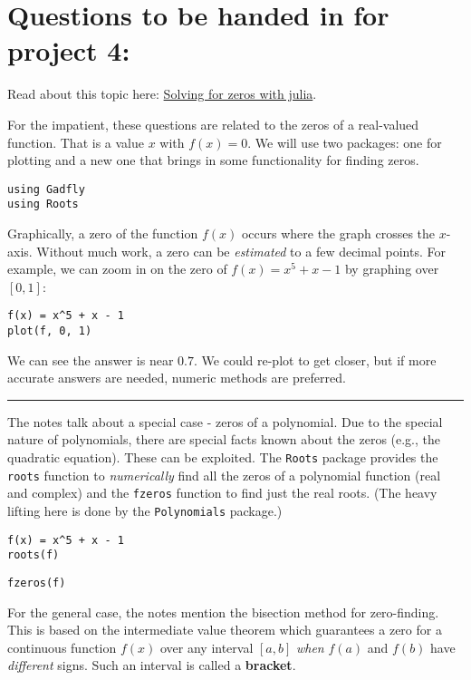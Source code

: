 \documentclass[12pt]{article}
\begin{document}
\section{Questions to be handed in for project 4:}

Read about this topic here:
\href{http://mth229.github.io/zeros.html}{Solving for zeros with julia}.

For the impatient, these questions are related to the zeros of a
real-valued function. That is a value $x$ with $f(x)=0$. We will use two
packages: one for plotting and a new one that brings in some
functionality for finding zeros.



\begin{verbatim}
using Gadfly        
using Roots
\end{verbatim}
Graphically, a zero of the function $f(x)$ occurs where the graph
crosses the $x$-axis. Without much work, a zero can be \emph{estimated}
to a few decimal points. For example, we can zoom in on the zero of
$f(x) = x^5 + x - 1$ by graphing over $[0,1]$:



\begin{verbatim}
f(x) = x^5 + x - 1
plot(f, 0, 1)
\end{verbatim}
We can see the answer is near $0.7$. We could re-plot to get closer, but
if more accurate answers are needed, numeric methods are preferred.

\begin{center}\rule{3in}{0.4pt}\end{center}

The notes talk about a special case - zeros of a polynomial. Due to the
special nature of polynomials, there are special facts known about the
zeros (e.g., the quadratic equation). These can be exploited. The
\texttt{Roots} package provides the \texttt{roots} function to
\emph{numerically} find all the zeros of a polynomial function (real and
complex) and the \texttt{fzeros} function to find just the real roots.
(The heavy lifting here is done by the \texttt{Polynomials} package.)



\begin{verbatim}
f(x) = x^5 + x - 1
roots(f)
\end{verbatim}


\begin{verbatim}
fzeros(f)
\end{verbatim}
For the general case, the notes mention the bisection method for
zero-finding. This is based on the intermediate value theorem which
guarantees a zero for a continuous function $f(x)$ over any interval
$[a,b]$ \emph{when} $f(a)$ and $f(b)$ have \emph{different} signs. Such
an interval is called a \textbf{bracket}.
\end{document}

